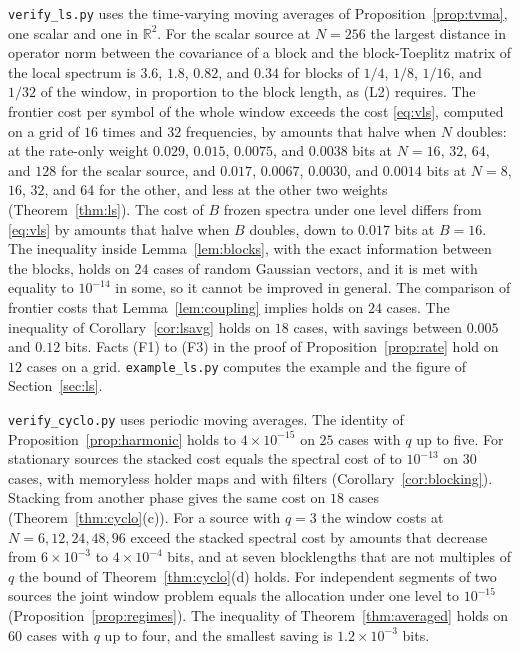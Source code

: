 \documentclass[11pt,onecolumn]{IEEEtran}
\newcommand{\R}{\mathbb{R}}
\begin{document}
\texttt{verify\_ls.py} uses the time-varying moving averages of
Proposition~\ref{prop:tvma}, one scalar and one in $\R^2$. For the
scalar source at $N=256$ the largest distance in operator norm between
the covariance of a block and the block-Toeplitz matrix of the local
spectrum is $3.6$, $1.8$, $0.82$, and $0.34$ for blocks of $1/4$, $1/8$,
$1/16$, and $1/32$ of the window, in proportion to the block length, as
(L2) requires. The frontier cost per symbol of the whole window exceeds
the cost \eqref{eq:vls}, computed on a grid of $16$ times and $32$
frequencies, by amounts that halve when $N$ doubles: at the rate-only
weight $0.029$, $0.015$, $0.0075$, and $0.0038$ bits at $N=16$, $32$,
$64$, and $128$ for the scalar source, and $0.017$, $0.0067$, $0.0030$,
and $0.0014$ bits at $N=8$, $16$, $32$, and $64$ for the other, and
less at the other two weights (Theorem~\ref{thm:ls}). The cost of $B$
frozen spectra under one level differs from \eqref{eq:vls} by amounts
that halve when $B$ doubles, down to $0.017$ bits at $B=16$. The
inequality inside Lemma~\ref{lem:blocks}, with the exact information
between the blocks, holds on $24$ cases of random Gaussian vectors, and
it is met with equality to $10^{-14}$ in some, so it cannot be improved
in general. The comparison of frontier costs that
Lemma~\ref{lem:coupling} implies holds on $24$ cases. The inequality of
Corollary~\ref{cor:lsavg} holds on $18$ cases, with savings between
$0.005$ and $0.12$ bits. Facts (F1) to (F3) in the proof of
Proposition~\ref{prop:rate} hold on $12$ cases on a grid. \texttt{example\_ls.py} computes the example
and the figure of Section~\ref{sec:ls}.

\texttt{verify\_cyclo.py} uses periodic moving averages. The identity
of Proposition~\ref{prop:harmonic} holds to $4\times10^{-15}$ on $25$
cases with $q$ up to five. For stationary sources the stacked cost
equals the spectral cost of \cite{part2} to $10^{-13}$ on $30$ cases,
with memoryless holder maps and with filters
(Corollary~\ref{cor:blocking}). Stacking from another phase gives the
same cost on $18$ cases (Theorem~\ref{thm:cyclo}(c)). For a source
with $q=3$ the window costs at $N=6,12,24,48,96$ exceed the stacked
spectral cost by amounts that decrease from $6\times10^{-3}$ to
$4\times10^{-4}$ bits, and at seven blocklengths that are not multiples
of $q$ the bound of Theorem~\ref{thm:cyclo}(d) holds. For independent
segments of two sources the joint window problem equals the allocation
under one level to $10^{-15}$ (Proposition~\ref{prop:regimes}). The
inequality of Theorem~\ref{thm:averaged} holds on $60$ cases with $q$
up to four, and the smallest saving is $1.2\times10^{-3}$ bits.
\end{document}
